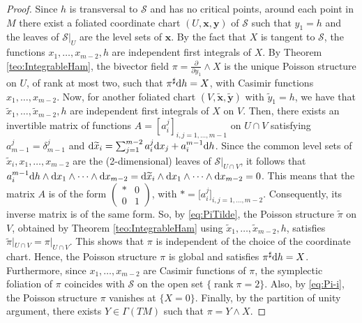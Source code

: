 \documentclass[pdftex]{sigma}%
\newcommand{\dd}{{\rm d}}
\numberwithin{equation}{section}
\begin{document}
\begin{proof}
Since $h$ is transversal to $\mathcal{S}$ and has no critical points, around each point in $M$ there exist a foliated coordinate chart $(U,\boldsymbol{x},\boldsymbol{y})$ of $\mathcal{S}$ such that $y_1=h$ and the leaves of $\mathcal{S}|_{U}$ are the level sets of $\boldsymbol{x}$. By the fact that $X$ is tangent to $\mathcal{S}$, the functions $x_1,\dots,x_{m-2},h$ are independent first integrals of $X$. By Theorem \ref{teo:IntegrableHam}, the bivector field $\pi=\frac{\partial}{\partial y_1}\wedge X$ is the unique Poisson structure on $U$, of rank at most two, such that $\pi^{\sharp}\dd h=X$, with Casimir functions $x_{1}, \dots, x_{m-2}$. Now, for another foliated chart $(V,\widetilde{\boldsymbol{x}},\widetilde{\boldsymbol{y}})$ with $\widetilde{y}_{1}=h$,
we have that $\widetilde{x}_1,\dots, \widetilde{x}_{m-2},h$ are independent first integrals of $X$ on $V$. Then, there exists an invertible matrix of functions $A=[a^{j}_{i}]_{i,j=1,\dots,m-1}$ on $U\cap V$ satisfying $a^{j}_{m-1}=\delta^{j}_{m-1}$ and $\dd \widetilde{x}_{i} = \sum_{j=1}^{m-2}a^{j}_{i}\dd x_{j} + a^{m-1}_{i}\dd h$. Since the common level sets of $\widetilde{x}_{i},x_1,\dots,x_{m-2}$ are the (2-dimensional) leaves of $\mathcal{S}|_{U\cap V}$, it follows that $a^{m-1}_{i}\dd h\wedge\dd x_{1}\wedge\cdots\wedge\dd x_{m-2} = \dd \widetilde{x}_{i}\wedge\dd x_{1}\wedge\cdots\wedge\dd x_{m-2}=0$. This means that the matrix $A$ is of the form $\left(\begin{smallmatrix}
 \ast & 0 \\
 0 & 1
 \end{smallmatrix}\right)$,
with $\ast=\big[a^{j}_{i}\big]_{i,j=1,\dots,m-2}$. Consequently, its inverse matrix is of the same form. So, by \eqref{eq:PiTilde}, the Poisson structure $\widetilde{\pi}$ on $V$, obtained by Theorem \ref{teo:IntegrableHam} using $\widetilde{x}_1,\dots, \widetilde{x}_{m-2},h$, satisfies $\widetilde{\pi}|_{U\cap V}=\pi|_{U\cap V}$. This shows that $\pi$ is independent of the choice of the coordinate chart. Hence, the Poisson structure $\pi$ is global and satisfies $\pi^{\sharp}\dd h=X$. Furthermore, since $x_{1},\dots,x_{m-2}$ are Casimir functions of $\pi$, the symplectic foliation of $\pi$ coincides with $\mathcal{S}$ on the open set $\{\operatorname{rank}\pi = 2\}$. Also, by \eqref{eq:Pi-i}, the Poisson structure $\pi$ vanishes at $\{X=0\}$. Finally, by the partition of unity argument, there exists $Y \in \Gamma(TM)$ such that $\pi=Y \wedge X$.
\end{proof}
\end{document}
